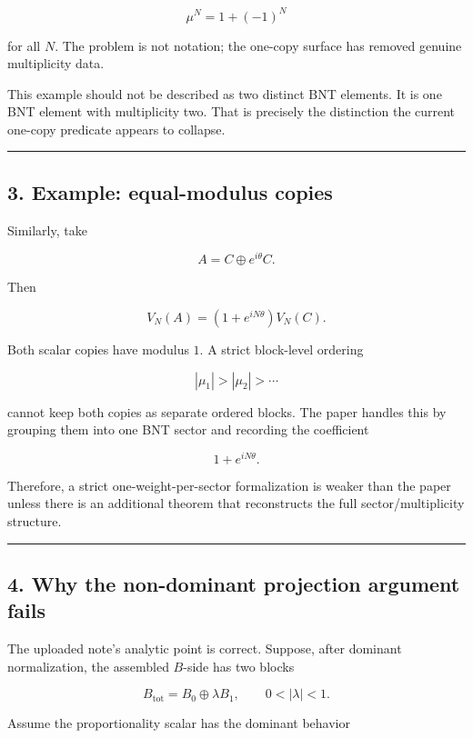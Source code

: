 \documentclass[
  11pt,
]{article}
\begin{document}
\[
\mu^N = 1+(-1)^N
\]

for all \(N\). The problem is not notation; the one-copy surface has
removed genuine multiplicity data.

This example should not be described as two distinct BNT elements. It is
one BNT element with multiplicity two. That is precisely the distinction
the current one-copy predicate appears to collapse.

\begin{center}\rule{0.5\linewidth}{0.5pt}\end{center}

\subsection{3. Example: equal-modulus
copies}\label{example-equal-modulus-copies}

Similarly, take

\[
A = C \oplus e^{i\theta}C.
\]

Then

\[
V_N(A)=(1+e^{iN\theta})V_N(C).
\]

Both scalar copies have modulus \(1\). A strict block-level ordering

\[
|\mu_1|>|\mu_2|>\cdots
\]

cannot keep both copies as separate ordered blocks. The paper handles
this by grouping them into one BNT sector and recording the coefficient

\[
1+e^{iN\theta}.
\]

Therefore, a strict one-weight-per-sector formalization is weaker than
the paper unless there is an additional theorem that reconstructs the
full sector/multiplicity structure.

\begin{center}\rule{0.5\linewidth}{0.5pt}\end{center}

\subsection{4. Why the non-dominant projection argument
fails}\label{why-the-non-dominant-projection-argument-fails}

The uploaded note's analytic point is correct. Suppose, after dominant
normalization, the assembled \(B\)-side has two blocks

\[
B_{\mathrm{tot}}=B_0\oplus \lambda B_1,
\qquad 0<|\lambda|<1.
\]

Assume the proportionality scalar has the dominant behavior
\end{document}
